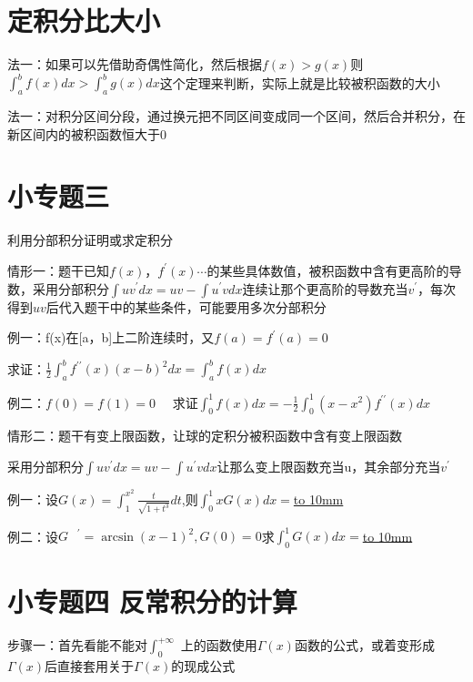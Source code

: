 \documentclass[a4paper,11pt]{book}
\begin{document}
\section*{定积分比大小}

法一：如果可以先借助奇偶性简化，然后根据$f(x)>g(x)$则
$\displaystyle{\int _{a}^{b}f(x)dx > \int _{a}^{b}g(x)dx}$这个定理来判断，实际上就是比较被积函数的大小

\vspace{2ex}

\noindent 法一：对积分区间分段，通过换元把不同区间变成同一个区间，然后合并积分，在新区间内的被积函数恒大于0

\section*{小专题三}

利用分部积分证明或求定积分

情形一：题干已知$f(x)，f^{\prime}(x)\cdots$的某些具体数值，被积函数中含有更高阶的导数，采用分部积分$\int u v^{\prime}dx=uv-\int u^{\prime}vdx$连续让那个更高阶的导数充当$v^{\prime}$，每次得到$uv$后代入题干中的某些条件，可能要用多次分部积分

例一：f(x)在[a，b]上二阶连续时，又$f(a)=f^{\prime}(a)=0$

求证：$\displaystyle{\frac{1}{2} \int _{a}^{b}f^{\prime \prime}(x)(x-b)^{2}dx=\int _{a}^{b}f(x)dx}$

例二：$f(0)=f(1)=0\quad$ 求证$\displaystyle{\int _{0}^{1}f(x)dx=-\frac{1}{2}\int _{0}^{1}(x-x^{2})f^{\prime\prime}(x)dx}$

情形二：题干有变上限函数，让球的定积分被积函数中含有变上限函数

采用分部积分$\int u v^{\prime}dx=uv-\int u^{\prime} v dx$让那么变上限函数充当u，其余部分充当$v^{\prime}$

例一：设$\displaystyle{G(x)=\int _{1}^{x^{2}}\frac{t}{\sqrt{1+t^{3}}}dt}$,则$\displaystyle{\int _{0}^{1}xG(x)dx=}$\underline{\hbox to 10mm{}}

例二：设$G^{\quad \prime}=\arcsin (x-1)^{2},G(0)=0$求$\displaystyle{\int _{0}^{1}G(x)dx=}$\underline{\hbox to 10mm{}}

\section*{小专题四 \quad 反常积分的计算}

步骤一：首先看能不能对$\int _{0}^{+\infty}$ 上的函数使用$\Gamma(x)$函数的公式，或着变形成$\Gamma(x)$后直接套用关于$\Gamma(x)$的现成公式
\end{document}
